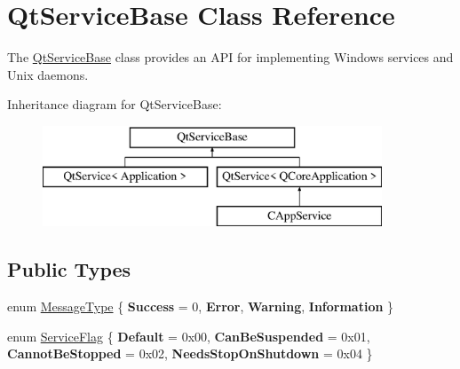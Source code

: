 \hypertarget{class_qt_service_base}{}\section{Qt\+Service\+Base Class Reference}
\label{class_qt_service_base}


The \hyperlink{class_qt_service_base}{Qt\+Service\+Base} class provides an A\+PI for implementing Windows services and Unix daemons.  


Inheritance diagram for Qt\+Service\+Base\+:\begin{figure}[H]
\begin{center}
\leavevmode
\includegraphics[height=3.000000cm]{class_qt_service_base}
\end{center}
\end{figure}
\subsection*{Public Types}
\begin{DoxyCompactItemize}
\item 
enum \hyperlink{class_qt_service_base_acffd9389fe7178bf1f35d8bf3dae1095}{Message\+Type} \{ {\bfseries Success} = 0, 
{\bfseries Error}, 
{\bfseries Warning}, 
{\bfseries Information}
 \}
\item 
enum \hyperlink{class_qt_service_base_af6e74a87329ef64760783364538e5d51}{Service\+Flag} \{ {\bfseries Default} = 0x00, 
{\bfseries Can\+Be\+Suspended} = 0x01, 
{\bfseries Cannot\+Be\+Stopped} = 0x02, 
{\bfseries Needs\+Stop\+On\+Shutdown} = 0x04
 \}
\end{DoxyCompactItemize}
